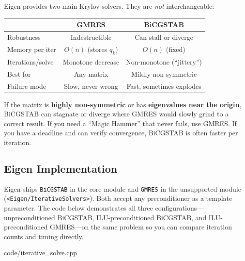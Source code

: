 Eigen provides two main Krylov solvers.  They are \emph{not}
interchangeable:

\begin{center}
\renewcommand{\arraystretch}{1.3}
\begin{tabular}{@{}lcc@{}}
\toprule
& \textbf{GMRES} & \textbf{BiCGSTAB} \\
\midrule
Robustness        & Indestructible      & Can stall or diverge \\
Memory per iter   & $O(n)$ (stores $q_k$) & $O(n)$ (fixed) \\
Iterations/solve  & Monotone decrease   & Non-monotone (``jittery'') \\
Best for          & Any matrix          & Mildly non-symmetric \\
Failure mode      & Slow, never wrong   & Fast, sometimes explodes \\
\bottomrule
\end{tabular}
\end{center}

\begin{warningbox}
If the matrix is \textbf{highly non-symmetric} or has
\textbf{eigenvalues near the origin}, BiCGSTAB can stagnate or
diverge where GMRES would slowly grind to a correct result.
If you need a ``Magic Hammer'' that never fails, use GMRES.
If you have a deadline and can verify convergence, BiCGSTAB is
often faster per iteration.
\end{warningbox}

\subsection{Eigen Implementation}

Eigen ships \texttt{BiCGSTAB} in the core module and \texttt{GMRES}
in the unsupported module (\texttt{<Eigen/IterativeSolvers>}).
Both accept any preconditioner as a template parameter.  The code
below demonstrates all three configurations---unpreconditioned BiCGSTAB,
ILU-preconditioned BiCGSTAB, and ILU-preconditioned GMRES---on the
same problem so you can compare iteration counts and timing directly.


                {code/iterative_solve.cpp}
